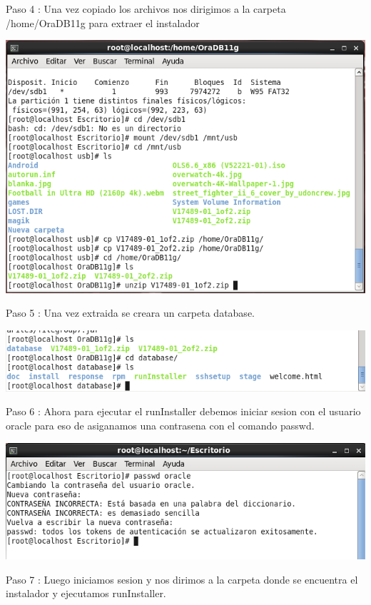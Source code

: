 \documentclass[12pt,letterpaper]{article}
\begin{document}
Paso 4 : Una vez copiado los archivos nos dirigimos a la carpeta /home/OraDB11g  para extraer el instalador
\begin{center}
\includegraphics[width=15cm]{./oraclelinux/7.png}
\end{center}
Paso 5 : Una vez extraida se creara un carpeta database.

\begin{center}
\includegraphics[width=15cm]{./oraclelinux/8.png}
\end{center}
Paso 6 : Ahora para ejecutar el runInstaller debemos iniciar sesion con el usuario oracle para eso de asiganamos una contrasena con el comando passwd.
\begin{center}
\includegraphics[width=15cm]{./oraclelinux/9.png}
\end{center}

Paso 7 : Luego iniciamos sesion y nos dirimos a la carpeta donde se encuentra el instalador y ejecutamos runInstaller.
\end{document}
